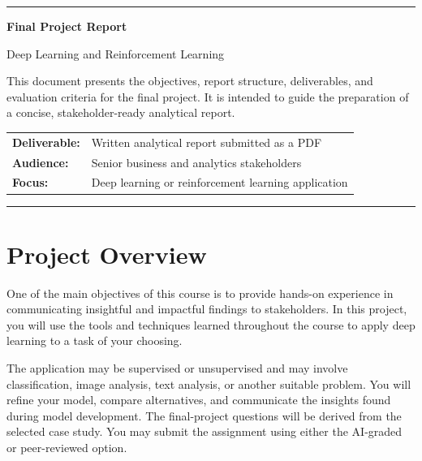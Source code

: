 \documentclass[11pt,letterpaper]{article}
\begin{document}
\begin{titlepage}
  \thispagestyle{empty}
  \vspace*{1.25in}
  \rule{\textwidth}{2pt}
  \vspace{0.35in}

  {\Huge\bfseries Final Project Report\par}
  \vspace{0.2in}
  {\Large Deep Learning and Reinforcement Learning\par}

  \vspace{0.55in}
  \begin{minipage}{0.86\textwidth}
    \large
    This document presents the objectives, report structure, deliverables,
    and evaluation criteria for the final project. It is intended to guide
    the preparation of a concise, stakeholder-ready analytical report.
  \end{minipage}

  \vfill
  \begin{tabular}{@{}ll@{}}
    \textbf{Deliverable:} & Written analytical report submitted as a PDF\\
    \textbf{Audience:} & Senior business and analytics stakeholders\\
    \textbf{Focus:} & Deep learning or reinforcement learning application
  \end{tabular}

  \vspace{0.55in}
  \rule{\textwidth}{2pt}
\end{titlepage}

\tableofcontents
\newpage

\section{Project Overview}

One of the main objectives of this course is to provide hands-on experience
in communicating insightful and impactful findings to stakeholders. In this
project, you will use the tools and techniques learned throughout the course
to apply deep learning to a task of your choosing.

The application may be supervised or unsupervised and may involve
classification, image analysis, text analysis, or another suitable problem.
You will refine your model, compare alternatives, and communicate the
insights found during model development. The final-project questions will be
derived from the selected case study. You may submit the assignment using
either the AI-graded or peer-reviewed option.
\end{document}
